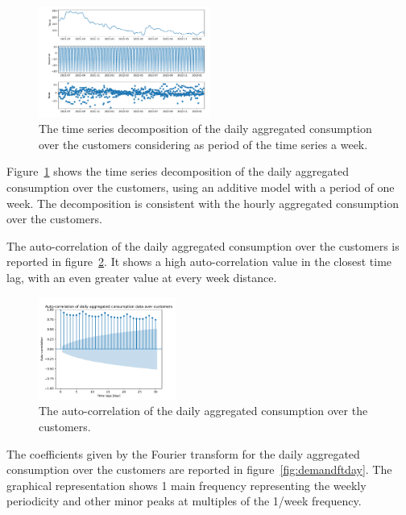 \begin{figure}[H]
\centering
\includegraphics[width=0.5\textwidth]{images/demand/daily_aggregated_decomposition}
\caption{The time series decomposition of the daily aggregated consumption over the customers considering as period of the time series a week.}
\label{fig:demanddecompositionday}
\end{figure}

Figure~\ref{fig:demanddecompositionday} shows the time series decomposition of the daily aggregated consumption over the customers, using an additive model with a period of one week.
The decomposition is consistent with the hourly aggregated consumption over the customers.

The auto-correlation of the daily aggregated consumption over the customers is reported in figure~\ref{fig:demandcorrelationday}.
It shows a high auto-correlation value in the closest time lag, with an even greater value at every week distance.

\begin{figure}[H]
\centering
\includegraphics[width=0.4\textwidth]{images/demand/daily_aggregated_correlation}
\caption{The auto-correlation of the daily aggregated consumption over the customers.}
\label{fig:demandcorrelationday}
\end{figure}

The coefficients given by the Fourier transform for the daily aggregated consumption over the customers are reported in figure~\ref{fig:demandftday}.
The graphical representation shows 1 main frequency representing the weekly periodicity and other minor peaks at multiples of the 1/week frequency.

